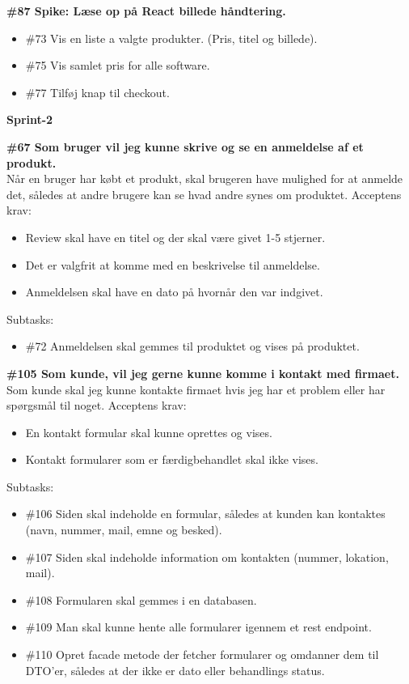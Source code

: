 \documentclass[11pt]{report}
\begin{document}
\noindent\textbf{\#87 Spike: Læse op på React billede håndtering.}
\begin{itemize}[topsep=0pt, partopsep=0pt]
  \item \#73 Vis en liste a valgte produkter. (Pris, titel og billede). 
  \item \#75 Vis samlet pris for alle software.
  \item \#77 Tilføj knap til checkout.
\end{itemize}

\noindent\textbf{Sprint-2}

\noindent\textbf{\#67 Som bruger vil jeg kunne skrive og se en anmeldelse af et produkt.}\\
\noindent Når en bruger har købt et produkt, skal brugeren have mulighed for at anmelde det, således at andre brugere kan se hvad andre synes om produktet.
\noindent Acceptens krav:
\begin{itemize}[topsep=0pt, partopsep=0pt]
  \item Review skal have en titel og der skal være givet 1-5 stjerner.
  \item Det er valgfrit at komme med en beskrivelse til anmeldelse.
  \item Anmeldelsen skal have en dato på hvornår den var indgivet.
\end{itemize}
\noindent Subtasks:
\begin{itemize}[topsep=0pt, partopsep=0pt]
  \item \#72 Anmeldelsen skal gemmes til produktet og vises på produktet.
\end{itemize}

\noindent\textbf{\#105 Som kunde, vil jeg gerne kunne komme i kontakt med firmaet.}\\
\noindent Som kunde skal jeg kunne kontakte firmaet hvis jeg har et problem eller har spørgsmål til noget.
\noindent Acceptens krav:
\begin{itemize}[topsep=0pt, partopsep=0pt]
  \item En kontakt formular skal kunne oprettes og vises.
  \item Kontakt formularer som er færdigbehandlet skal ikke vises.
\end{itemize}
\noindent Subtasks:
\begin{itemize}[topsep=0pt, partopsep=0pt]
  \item \#106 Siden skal indeholde en formular, således at kunden kan kontaktes (navn, nummer, mail, emne og besked).
  \item \#107 Siden skal indeholde information om kontakten (nummer, lokation, mail).
  \item \#108 Formularen skal gemmes i en databasen.
  \item \#109 Man skal kunne hente alle formularer igennem et rest endpoint.
  \item \#110 Opret facade metode der fetcher formularer og omdanner dem til DTO'er, således at der ikke er dato eller behandlings status.
\end{itemize}
\end{document}
